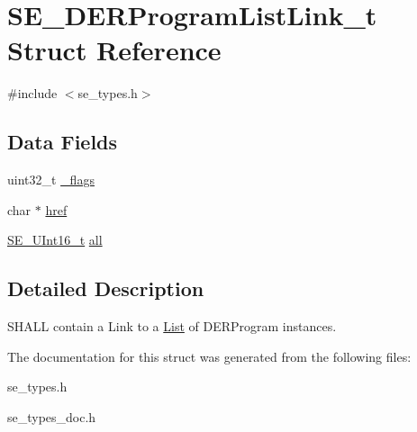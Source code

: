 \hypertarget{structSE__DERProgramListLink__t}{}\section{S\+E\+\_\+\+D\+E\+R\+Program\+List\+Link\+\_\+t Struct Reference}
\label{structSE__DERProgramListLink__t}


{\ttfamily \#include $<$se\+\_\+types.\+h$>$}

\subsection*{Data Fields}
\begin{DoxyCompactItemize}
\item 
uint32\+\_\+t \hyperlink{group__DERProgramListLink_ga42a0edb4880deca3d413aa643f18d56c}{\+\_\+flags}
\item 
char $\ast$ \hyperlink{group__DERProgramListLink_gafbc96a7ac9d21a98c3a38be05f853758}{href}
\item 
\hyperlink{group__UInt16_gac68d541f189538bfd30cfaa712d20d29}{S\+E\+\_\+\+U\+Int16\+\_\+t} \hyperlink{group__DERProgramListLink_ga18b1991f92601ccd150af4f127efa8cd}{all}
\end{DoxyCompactItemize}


\subsection{Detailed Description}
S\+H\+A\+LL contain a Link to a \hyperlink{structList}{List} of D\+E\+R\+Program instances. 

The documentation for this struct was generated from the following files\+:\begin{DoxyCompactItemize}
\item 
se\+\_\+types.\+h\item 
se\+\_\+types\+\_\+doc.\+h\end{DoxyCompactItemize}
